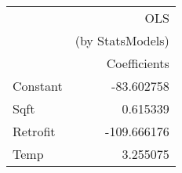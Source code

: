 \begin{tabular}{lr}
\toprule
{} &               OLS \\
{} &  (by StatsModels) \\
{} &      Coefficients \\
\midrule
Constant &        -83.602758 \\
Sqft     &          0.615339 \\
Retrofit &       -109.666176 \\
Temp     &          3.255075 \\
\bottomrule
\end{tabular}
